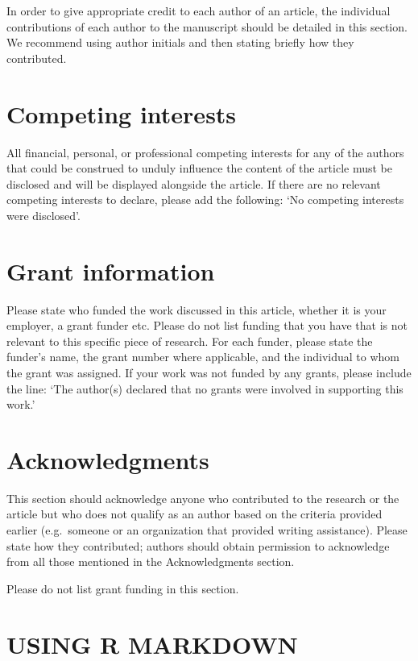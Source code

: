 \documentclass[9pt,a4paper,]{extarticle}
\begin{document}
In order to give appropriate credit to each author of an article, the individual contributions of each author to the manuscript should be detailed in this section. We recommend using author initials and then stating briefly how they contributed.

\section{Competing interests}\label{competing-interests}

All financial, personal, or professional competing interests for any of the authors that could be construed to unduly influence the content of the article must be disclosed and will be displayed alongside the article. If there are no relevant competing interests to declare, please add the following: `No competing interests were disclosed'.

\section{Grant information}\label{grant-information}

Please state who funded the work discussed in this article, whether it is your employer, a grant funder etc. Please do not list funding that you have that is not relevant to this specific piece of research. For each funder, please state the funder's name, the grant number where applicable, and the individual to whom the grant was assigned. If your work was not funded by any grants, please include the line: `The author(s) declared that no grants were involved in supporting this work.'

\section{Acknowledgments}\label{acknowledgments}

This section should acknowledge anyone who contributed to the research or the article but who does not qualify as an author based on the criteria provided earlier (e.g.~someone or an organization that provided writing assistance). Please state how they contributed; authors should obtain permission to acknowledge from all those mentioned in the Acknowledgments section.

Please do not list grant funding in this section.

\section{USING R MARKDOWN}\label{using-r-markdown}
\end{document}
